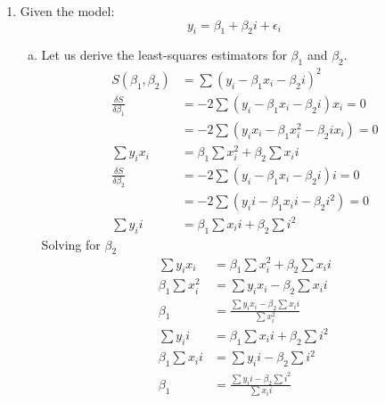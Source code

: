 \documentclass[12pt]{article}
\begin{document}
\begin{enumerate}[1.]
\begin{enumerate}[(a)]
\begin{proof}
            \[=  \beta_1 \sum \frac{(x_i - \bar{x})^2}{(x_i - \bar{x})^2}  \]
            \[=  \beta_1 \]
            $\therefore E[\hat{\beta_1}] = \beta_1 $
            \end{proof}
            Using $k_i$ from earlier, we can proof that $Var[\hat{\beta_1}] = \frac{\sigma^2}{S_{xx}}$ 
            \[ Var[\hat{\beta_1}] = Var[\sum k_i (y_i - \bar{y})] \]
            \[ Var[\hat{\beta_1}] = \sum Var[k_i (y_i - \bar{y})] \]
            \[ Var[\hat{\beta_1}] = \sum k_i^2 Var[(y_i - \bar{y})] \]
    \end{enumerate}
    \item Given the model: 
        \[ y_i = \beta_1 + \beta_2 i + \epsilon_i \]
        \begin{enumerate}[(a)]
            \item Let us derive the least-squares estimators for $\beta_1$ and $\beta_2$.
            \begin{align*}
                S(\beta_1, \beta_2) &= \sum  (y_i - \beta_1 x_i - \beta_2 i)^2 \\
                \frac{\delta S}{\delta \beta_1} &= -2 \sum  (y_i - \beta_1 x_i - \beta_2 i)x_i = 0 \\
                &= -2 \sum  (y_i x_i - \beta_1 x_i^2 - \beta_2 i x_i)  = 0 \\
                \sum  y_i x_i &= \beta_1\sum  x_i^2 + \beta_2\sum  x_i i \\ 
                \frac{\delta S}{\delta \beta_2} &= -2 \sum  (y_i - \beta_1 x_i - \beta_2 i)i = 0 \\
                &= -2 \sum  (y_i i - \beta_1 x_i i - \beta_2 i^2) = 0 \\
                \sum  y_i i &= \beta_1\sum  x_i i + \beta_2\sum  i^2 
            \end{align*}
            Solving for $\beta_2$
            \begin{align*}
                \sum  y_i x_i &= \beta_1\sum  x_i^2 + \beta_2\sum  x_i i\\ 
                \beta_1\sum  x_i^2 &= \sum  y_i x_i - \beta_2\sum  x_i i \\ 
                \beta_1 &= \frac{\sum  y_i x_i - \beta_2\sum  x_i i}{\sum  x_i^2} \\ 
                \sum  y_i i &= \beta_1\sum  x_i i + \beta_2\sum  i^2 \\ 
                \beta_1\sum  x_i i &= \sum  y_i i - \beta_2\sum  i^2 \\ 
                \beta_1 &= \frac{ \sum  y_i i - \beta_2\sum  i^2}{\sum  x_i i}

\end{align*}
\end{enumerate}
\end{enumerate}
\end{document}

